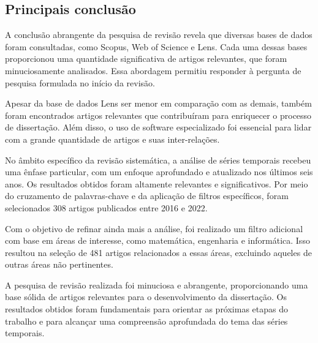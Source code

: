 \subsection{Principais conclus\~ao} \label{subsec:conclusão da revisão}

A conclusão abrangente da pesquisa de revisão revela que diversas bases de dados foram consultadas, como Scopus, Web of Science e Lens. Cada uma dessas bases proporcionou uma quantidade significativa de artigos relevantes, que foram minuciosamente analisados. Essa abordagem permitiu responder à pergunta de pesquisa formulada no início da revisão.

Apesar da base de dados Lens ser menor em comparação com as demais, também foram encontrados artigos relevantes que contribuíram para enriquecer o processo de dissertação. Além disso, o uso de software especializado foi essencial para lidar com a grande quantidade de artigos e suas inter-relações.

No âmbito específico da revisão sistemática, a análise de séries temporais recebeu uma ênfase particular, com um enfoque aprofundado e atualizado nos últimos seis anos. Os resultados obtidos foram altamente relevantes e significativos. Por meio do cruzamento de palavras-chave e da aplicação de filtros específicos, foram selecionados 308 artigos publicados entre 2016 e 2022.

Com o objetivo de refinar ainda mais a análise, foi realizado um filtro adicional com base em áreas de interesse, como matemática, engenharia e informática. Isso resultou na seleção de 481 artigos relacionados a essas áreas, excluindo aqueles de outras áreas não pertinentes.

A pesquisa de revisão realizada foi minuciosa e abrangente, proporcionando uma base sólida de artigos relevantes para o desenvolvimento da dissertação. Os resultados obtidos foram fundamentais para orientar as próximas etapas do trabalho e para alcançar uma compreensão aprofundada do tema das séries temporais.